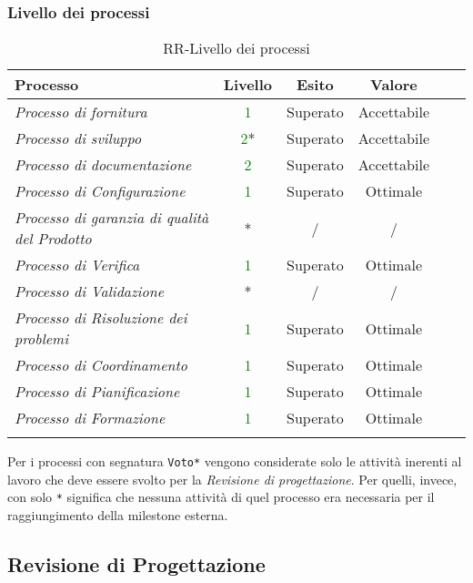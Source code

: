 \newpage

\subsubsection{Livello dei processi}
\begin{longtable}{|>{\centering}m{6cm}|c|c|c|c|c|}
\hline
\textbf{Processo} & \textbf{Livello} & \textbf{Esito} & \textbf{Valore}\\
\hline
\endhead
\emph{Processo di fornitura} & \textcolor{Green}{1} & Superato & Accettabile\\ \hline
\emph{Processo di sviluppo} & \textcolor{Green}{2}* & Superato & Accettabile\\ \hline
\emph{Processo di documentazione} & \textcolor{Green}{2} & Superato & Accettabile\\ 
\hline
\emph{Processo di Configurazione} & \textcolor{Green}{1} & Superato & Ottimale\\ 
\hline
\emph{Processo di garanzia di qualità del Prodotto} & * & / & /\\ 
\hline
\emph{Processo di Verifica} & \textcolor{Green}{1} & Superato & Ottimale\\ 
\hline
\emph{Processo di Validazione} & * & / & /\\ 
\hline
\emph{Processo di Risoluzione dei problemi} & \textcolor{Green}{1} & Superato & Ottimale\\ 
\hline
\emph{Processo di Coordinamento} & \textcolor{Green}{1} & Superato & Ottimale\\ 
\hline
\emph{Processo di Pianificazione} & \textcolor{Green}{1} & Superato & Ottimale\\ 
\hline
\emph{Processo di Formazione} & \textcolor{Green}{1} & Superato & Ottimale\\ 
\hline
\caption{RR-Livello dei processi}
\end{longtable}

Per i processi con segnatura \texttt{Voto*} vengono considerate solo le attività inerenti al lavoro che deve essere svolto per la \textit{Revisione di progettazione}. Per quelli, invece, con solo \texttt{*} significa che nessuna attività di quel processo era necessaria per il raggiungimento della milestone esterna.

\newpage

\subsection{Revisione di Progettazione}

